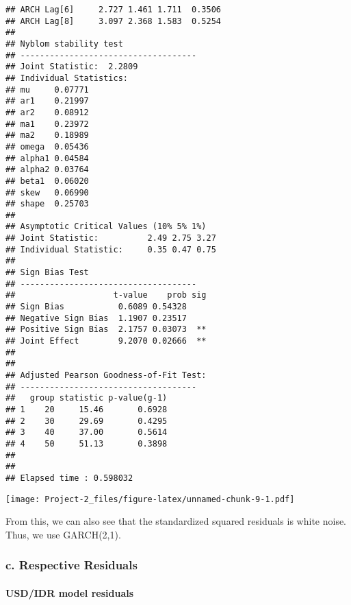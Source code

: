 \documentclass[]{article}
\newenvironment{Shaded}{\begin{snugshade}}{\end{snugshade}}
\newcommand{\KeywordTok}[1]{\textcolor[rgb]{0.13,0.29,0.53}{\textbf{#1}}}
\newcommand{\DataTypeTok}[1]{\textcolor[rgb]{0.13,0.29,0.53}{#1}}
\newcommand{\StringTok}[1]{\textcolor[rgb]{0.31,0.60,0.02}{#1}}
\newcommand{\CommentTok}[1]{\textcolor[rgb]{0.56,0.35,0.01}{\textit{#1}}}
\newcommand{\OperatorTok}[1]{\textcolor[rgb]{0.81,0.36,0.00}{\textbf{#1}}}
\newcommand{\NormalTok}[1]{#1}
\let\oldparagraph\paragraph
\renewcommand{\paragraph}[1]{\oldparagraph{#1}\mbox{}}
\begin{document}
\begin{verbatim}
## ARCH Lag[6]     2.727 1.461 1.711  0.3506
## ARCH Lag[8]     3.097 2.368 1.583  0.5254
## 
## Nyblom stability test
## ------------------------------------
## Joint Statistic:  2.2809
## Individual Statistics:              
## mu     0.07771
## ar1    0.21997
## ar2    0.08912
## ma1    0.23972
## ma2    0.18989
## omega  0.05436
## alpha1 0.04584
## alpha2 0.03764
## beta1  0.06020
## skew   0.06990
## shape  0.25703
## 
## Asymptotic Critical Values (10% 5% 1%)
## Joint Statistic:          2.49 2.75 3.27
## Individual Statistic:     0.35 0.47 0.75
## 
## Sign Bias Test
## ------------------------------------
##                    t-value    prob sig
## Sign Bias           0.6089 0.54328    
## Negative Sign Bias  1.1907 0.23517    
## Positive Sign Bias  2.1757 0.03073  **
## Joint Effect        9.2070 0.02666  **
## 
## 
## Adjusted Pearson Goodness-of-Fit Test:
## ------------------------------------
##   group statistic p-value(g-1)
## 1    20     15.46       0.6928
## 2    30     29.69       0.4295
## 3    40     37.00       0.5614
## 4    50     51.13       0.3898
## 
## 
## Elapsed time : 0.598032
\end{verbatim}

\begin{Shaded}
\end{Shaded}

\texttt{[image: Project-2\_files/figure-latex/unnamed-chunk-9-1.pdf]}

From this, we can also see that the standardized squared residuals is
white noise. Thus, we use GARCH(2,1).

\subsubsection{c. Respective Residuals}\label{c.-respective-residuals}

\paragraph{USD/IDR model residuals}\label{usdidr-model-residuals}
\end{document}
